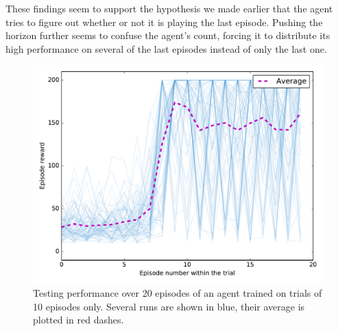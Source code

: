 These findings seem to support the hypothesis we made earlier that the agent
tries to figure out whether or not it is playing the last episode. Pushing
the horizon further seems to confuse the agent's count, forcing it 
to distribute its high performance on several of the last episodes instead
of only the last one.\\

\begin{figure}
	\centering
	\includegraphics[width=0.8\linewidth]{fig/horizon_10_3perms.pdf}
	\caption{Testing performance over 20 episodes of an agent trained on 
	trials of 10 episodes only. 
	Several runs are shown in blue, their average is plotted in red dashes.}
	\label{fig:horizon_10_3perms}
\end{figure}


